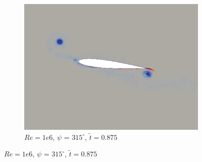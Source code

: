 \begin{figure}[H]
\begin{subfigure}[b]{0.32\textwidth}
		\includegraphics[width=1\textwidth]{figures/Vorticity_plots/Re_1m_1pt2/phase_315.png}
		\caption{$Re=1e6$, $\psi$ = $315^\circ$, $\tilde{t}=0.875$}
		\label{fig:Re_1m_1pt2_phi315}
	\end{subfigure}
	

\end{figure}
